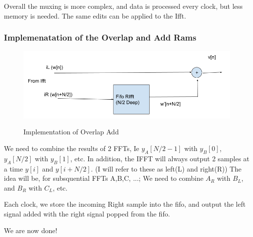 \documentclass{article}
\begin{document}
Overall the muxing is more complex, and data is processed every clock, but less memory is needed.
The same edits can be applied to the Ifft.

\pagebreak

\subsubsection{Implemenatation of the Overlap and Add Rams}

  \begin{figure}[h!]
    \centering
    \includegraphics[width=0.8\linewidth]{overlapadd_rams.png}
    \label{fig:overlap_add_rams}
    \caption{Implementation of Overlap Add}
  \end {figure}


We need to combine the results of 2 FFTs, Ie $y_{A}[N/2-1]$ with $y_{B}[0]$, $y_{A}[N/2]$ with $y_{B}[1]$, etc.
In addition, the IFFT will always output 2 samples at a time $y[i]$ and $y[i+N/2]$. (I will refer to these as left(L) and right(R))
The idea will be, for subsquential FFTs A,B,C, ...; We need to combine $A_{R}$ with $B_{L}$, and $B_{R}$ with $C_{L}$, etc.

Each clock, we store the incoming Right sample into the fifo, and output the left signal added with the right signal popped from the fifo.

We are now done!
\end{document}
